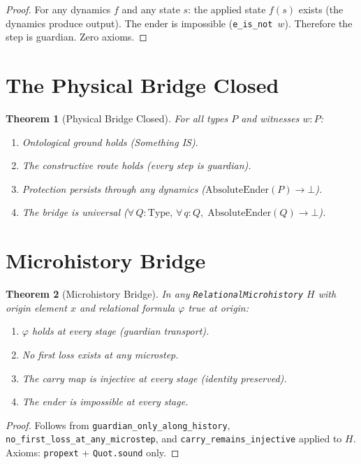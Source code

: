 \documentclass[12pt,a4paper]{article}
\newtheorem{theorem}{Theorem}[section]
\begin{document}
\begin{proof}
For any dynamics $f$ and any state $s$: the applied state $f(s)$ exists
(the dynamics produce output). The ender is impossible (\texttt{e\_is\_not}\, $w$).
Therefore the step is guardian. Zero axioms.
\end{proof}

\section{The Physical Bridge Closed}

\begin{theorem}[Physical Bridge Closed]\label{thm:bridge}
For all types $P$ and witnesses $w : P$:
\begin{enumerate}
    \item Ontological ground holds (Something IS).
    \item The constructive route holds (every step is guardian).
    \item Protection persists through any dynamics ($\text{AbsoluteEnder}(P) \to \bot$).
    \item The bridge is universal ($\forall\, Q : \text{Type},\, \forall\, q : Q,\;
    \text{AbsoluteEnder}(Q) \to \bot$).
\end{enumerate}
\end{theorem}

\section{Microhistory Bridge}

\begin{theorem}[Microhistory Bridge]\label{thm:micro}
In any \texttt{RelationalMicrohistory} $H$ with origin element $x$ and
relational formula $\varphi$ true at origin:
\begin{enumerate}
    \item $\varphi$ holds at every stage (guardian transport).
    \item No first loss exists at any microstep.
    \item The carry map is injective at every stage (identity preserved).
    \item The ender is impossible at every stage.
\end{enumerate}
\end{theorem}

\begin{proof}
Follows from \texttt{guardian\_only\_along\_history},
\texttt{no\_first\_loss\_at\_any\_microstep}, and
\texttt{carry\_remains\_injective} applied to $H$.
Axioms: \texttt{propext} + \texttt{Quot.sound} only.
\end{proof}
\end{document}
